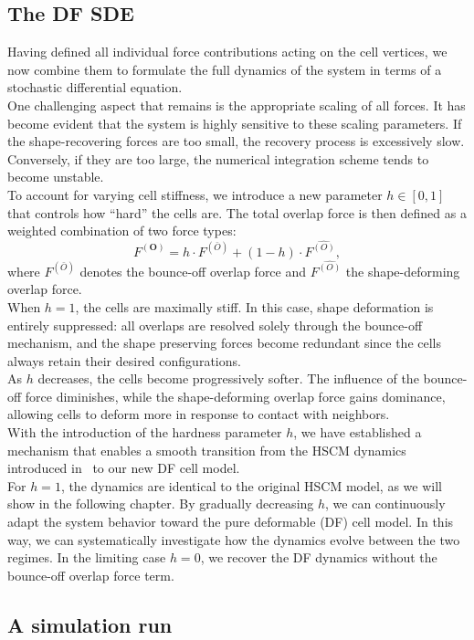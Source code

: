 \subsection{The DF SDE}
Having defined all individual force contributions acting on the cell vertices, we now combine them to formulate the full dynamics of the system in terms of a stochastic differential equation. \\
One challenging aspect that remains is the appropriate scaling of all forces.
It has become evident that the system is highly sensitive to these scaling parameters. 
If the shape-recovering forces are too small, the recovery process is excessively slow. 
Conversely, if they are too large, the numerical integration scheme tends to become unstable. \\ 
To account for varying cell stiffness, we introduce a new parameter $h \in [0, 1]$ that controls how \enquote{hard} the cells are. 
The total overlap force is then defined as a weighted combination of two force types:
\[
F^{(\mathbf{O})} = h \cdot F^{(\bar{O})} + (1 - h) \cdot F^{\hat{(O)}},
\]
where $F^{(\bar{O})}$ denotes the bounce-off overlap force and $F^{\hat{(O)}}$ the shape-deforming overlap force.\\
When $h = 1$, the cells are maximally stiff. 
In this case, shape deformation is entirely suppressed: all overlaps are resolved solely through the bounce-off mechanism, and the shape preserving forces become redundant since the cells always retain their desired configurations. \\
As $h$ decreases, the cells become progressively softer. 
The influence of the bounce-off force diminishes, while the shape-deforming overlap force gains dominance, allowing cells to deform more in response to contact with neighbors. \\
With the introduction of the hardness parameter $h$, we have established a mechanism that enables a smooth transition from the HSCM dynamics introduced in~\cite{Bruna2012} to our new DF cell model. \\
For $h = 1$, the dynamics are identical to the original HSCM model, as we will show in the following chapter. 
By gradually decreasing $h$, we can continuously adapt the system behavior toward the pure deformable (DF) cell model. 
In this way, we can systematically investigate how the dynamics evolve between the two regimes. 
In the limiting case $h = 0$, we recover the DF dynamics without the bounce-off overlap force term.

\subsection{A simulation run}
